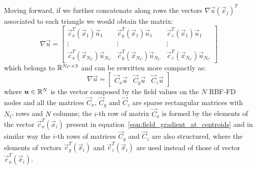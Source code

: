 Moving forward, if we further concatenate along rows the vectors $\nabla \vec{u}(\vec{x}_j)^T$ associated to each triangle we would obtain the matrix:
\begin{equation}
	\label{eqn:field_gradient_at_centroids}
	\nabla \vec{u} =
	\begin{bmatrix}
		\vec{c}_x^T(\vec{x}_1) \vec{u}_1  			  &  \vec{c}_y^T(\vec{x}_1) \vec{u}_1  		   &  \vec{c}_z^T(\vec{x}_1) \vec{u}_1  							\\
		\vdots									  & \vdots					   		 		   & \vdots															\\
		\vec{c}_x^T(\vec{x}_{N_C}) \vec{u}_{N_C}  &  \vec{c}_y^T(\vec{x}_{N_C}) \vec{u}_{N_C}  &  \vec{c}_z^T(\vec{x}_{N_C}) \vec{u}_{N_C}
	\end{bmatrix}
\end{equation}
which belongs to $\mathbb{R}^{N_C \times 3}$ and can be rewritten more compactly as:
\begin{equation}
	\nabla \vec{u} =
	\begin{bmatrix}
		\vec{C}_x \vec{u}  &  \vec{C}_y \vec{u}  &  \vec{C}_z \vec{u}
	\end{bmatrix}
\end{equation}
where $\boldsymbol{u} \in \mathbb{R}^{N}$ is the vector composed by the field values on the $N$ RBF-FD nodes and all the matrices $\vec{C}_x$, $\vec{C}_y$ and $\vec{C}_z$ are sparse rectangular matrices with $N_C$ rows and $N$ columns; the $i$-th row of matrix $\vec{C}_x$ is formed by the elements of the vector $\vec{c}_x^T(\vec{x}_i)$ present in equation~\eqref{eqn:field_gradient_at_centroids} and in similar way the $i$-th rows of matrices $\vec{C}_y$ and $\vec{C}_z$ are also structured, where the elements of vectors $\vec{c}_y^T(\vec{x}_i)$ and $\vec{c}_z^T(\vec{x}_i)$ are used instead of those of vector $\vec{c}_x^T(\vec{x}_i)$.

